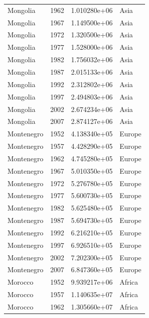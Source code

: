 \documentclass[
  letterpaper,
  DIV=11,
  numbers=noendperiod]{scrreprt}
\begin{document}
\begin{tcolorbox}
\begin{tabular}{lrrl}
Mongolia                 &  1962 &  1.010280e+06 &      Asia \\
Mongolia                 &  1967 &  1.149500e+06 &      Asia \\
Mongolia                 &  1972 &  1.320500e+06 &      Asia \\
Mongolia                 &  1977 &  1.528000e+06 &      Asia \\
Mongolia                 &  1982 &  1.756032e+06 &      Asia \\
Mongolia                 &  1987 &  2.015133e+06 &      Asia \\
Mongolia                 &  1992 &  2.312802e+06 &      Asia \\
Mongolia                 &  1997 &  2.494803e+06 &      Asia \\
Mongolia                 &  2002 &  2.674234e+06 &      Asia \\
Mongolia                 &  2007 &  2.874127e+06 &      Asia \\
Montenegro               &  1952 &  4.138340e+05 &    Europe \\
Montenegro               &  1957 &  4.428290e+05 &    Europe \\
Montenegro               &  1962 &  4.745280e+05 &    Europe \\
Montenegro               &  1967 &  5.010350e+05 &    Europe \\
Montenegro               &  1972 &  5.276780e+05 &    Europe \\
Montenegro               &  1977 &  5.600730e+05 &    Europe \\
Montenegro               &  1982 &  5.625480e+05 &    Europe \\
Montenegro               &  1987 &  5.694730e+05 &    Europe \\
Montenegro               &  1992 &  6.216210e+05 &    Europe \\
Montenegro               &  1997 &  6.926510e+05 &    Europe \\
Montenegro               &  2002 &  7.202300e+05 &    Europe \\
Montenegro               &  2007 &  6.847360e+05 &    Europe \\
Morocco                  &  1952 &  9.939217e+06 &    Africa \\
Morocco                  &  1957 &  1.140635e+07 &    Africa \\
Morocco                  &  1962 &  1.305660e+07 &    Africa \\

\end{tabular}
\end{tcolorbox}
\end{document}
